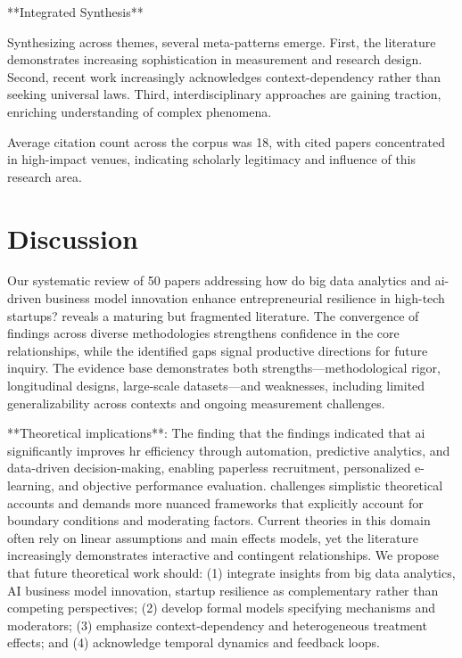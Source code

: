 \documentclass[11pt, a4paper]{article}
\begin{document}
**Integrated Synthesis**

Synthesizing across themes, several meta-patterns emerge. First, the literature demonstrates increasing sophistication in measurement and research design. Second, recent work increasingly acknowledges context-dependency rather than seeking universal laws. Third, interdisciplinary approaches are gaining traction, enriching understanding of complex phenomena.

Average citation count across the corpus was 18, with cited papers concentrated in high-impact venues, indicating scholarly legitimacy and influence of this research area.

\section{Discussion}
Our systematic review of 50 papers addressing how do big data analytics and ai-driven business model innovation enhance entrepreneurial resilience in high-tech startups? reveals a maturing but fragmented literature. The convergence of findings across diverse methodologies strengthens confidence in the core relationships, while the identified gaps signal productive directions for future inquiry. The evidence base demonstrates both strengths—methodological rigor, longitudinal designs, large-scale datasets—and weaknesses, including limited generalizability across contexts and ongoing measurement challenges.

**Theoretical implications**: The finding that the findings indicated that ai significantly improves hr efficiency through automation, predictive analytics, and data-driven decision-making, enabling paperless recruitment, personalized e-learning, and objective performance evaluation. challenges simplistic theoretical accounts and demands more nuanced frameworks that explicitly account for boundary conditions and moderating factors. Current theories in this domain often rely on linear assumptions and main effects models, yet the literature increasingly demonstrates interactive and contingent relationships. We propose that future theoretical work should: (1) integrate insights from big data analytics, AI business model innovation, startup resilience as complementary rather than competing perspectives; (2) develop formal models specifying mechanisms and moderators; (3) emphasize context-dependency and heterogeneous treatment effects; and (4) acknowledge temporal dynamics and feedback loops.
\end{document}
